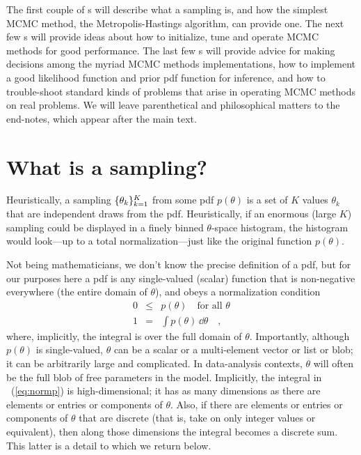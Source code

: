 \documentclass[12pt,twoside,pdftex]{article}
\newcommand{\pars}{\theta}
\begin{document}
The first couple of \sectionname s will describe what a sampling is, and how
the simplest MCMC method, the Metropolis-Hastings algorithm, can
provide one.
The next few \sectionname s will provide ideas about how to
initialize, tune and operate MCMC methods for good performance.
The last few \sectionname s will provide advice for making decisions
among the myriad MCMC methods implementations, how to implement a good
likelihood function and prior pdf function for inference, and how to
trouble-shoot standard kinds of problems that arise in operating MCMC
methods on real problems.
We will leave parenthetical and philosophical matters to the end-notes,
which appear after the main text.

\section{What is a sampling?}

Heuristically, a sampling $\setof{\pars_k}_{k=1}^K$ from some pdf $p(\pars)$
is a set of $K$ values $\pars_k$ that are independent draws from the pdf.
Heuristically, if an enormous (large $K$) sampling could be displayed
in a finely binned $\pars$-space histogram, the histogram would look---up
to a total normalization---just like the original function $p(\pars)$.

Not being mathematicians, we don't know the precise definition of a
pdf, but for our purposes here a pdf is
any single-valued (scalar) function that is non-negative everywhere
(the entire domain of $\pars$), and obeys a normalization condition
\begin{eqnarray}
0 &\leq& p(\pars) \quad \mbox{for all $\pars$}
\\ \label{eq:normp}
1 &=& \int p(\pars)\,\dd\pars
\quad ,
\end{eqnarray}
where, implicitly, the integral is over the full domain of $\pars$.
Importantly, although $p(\pars)$ is single-valued, $\pars$ can be a scalar or
a multi-element vector or list or blob; it can be arbitrarily large
and complicated.
In data-analysis contexts, $\pars$ will often be the full blob of free
parameters in the model.
Implicitly, the integral in \equationname~(\ref{eq:normp}) is high-dimensional; it
has as many dimensions as there are elements or entries or components of $\pars$.
Also, if there are elements or entries or components of $\pars$ that are discrete
(that is, take on only integer values or equivalent),
then along those dimensions the integral becomes a discrete sum.
This latter is a detail to which we return below.
\end{document}
